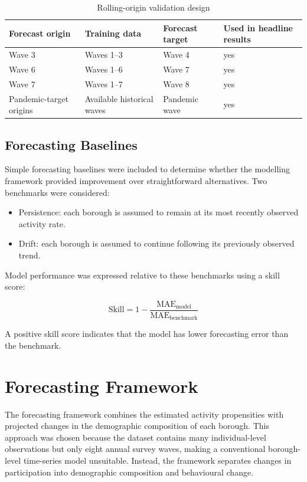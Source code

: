 \documentclass[ %
                    author={Ashrey Ashrey, Sanya Kapoor, Trisha Sharma, Yash Bhooshan Pandloskar},
                supervisor={Dr. Dalila O’Grady},
                    degree={MSc},
                     title={Using machine learning to forecast physical activity participation, volunteering and activity patterns in London},
                  subtitle={},
                      type={},
                      year={2021}]{dissertation}
\begin{document}
\begin{table}[!htb]
\centering
\label{tab:rolling-origin-validation}
\begin{tabular}{llll}
\toprule
\textbf{Forecast origin} &
\textbf{Training data} &
\textbf{Forecast target} &
\textbf{Used in headline results} \\
\midrule
Wave 3                  & Waves 1--3                  & Wave 4        & yes \\
Wave 6                  & Waves 1--6                  & Wave 7        & yes \\
Wave 7                  & Waves 1--7                  & Wave 8        & yes \\
Pandemic-target origins & Available historical waves & Pandemic wave & yes \\
\bottomrule
\end{tabular}
\caption{Rolling-origin validation design}
\end{table}

\FloatBarrier
\subsection{Forecasting Baselines}

\noindent
Simple forecasting baselines were included to determine whether the modelling framework provided improvement over straightforward alternatives. Two benchmarks were considered:

\begin{itemize}
\item Persistence: each borough is assumed to remain at its most recently observed activity rate.
\item Drift: each borough is assumed to continue following its previously observed trend.
\end{itemize}

Model performance was expressed relative to these benchmarks using a skill score:

\[
\mathrm{Skill}
=
1-
\frac{\mathrm{MAE}_{\mathrm{model}}}
{\mathrm{MAE}_{\mathrm{benchmark}}}
\]

A positive skill score indicates that the model has lower forecasting error than the benchmark.

\FloatBarrier
\section{Forecasting Framework}

\noindent
The forecasting framework combines the estimated activity propensities with projected changes in the demographic composition of each borough. This approach was chosen because the dataset contains many individual-level observations but only eight annual survey waves, making a conventional borough-level time-series model unsuitable. Instead, the framework separates changes in participation into demographic composition and behavioural change.
\end{document}
